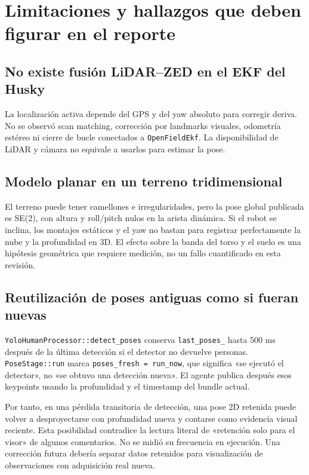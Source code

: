 \documentclass[11pt,a4paper]{article}
\newcommand{\code}[1]{\nolinkurl{#1}}
\begin{document}
\section{Limitaciones y hallazgos que deben figurar en el reporte}
\label{sec:limits}

\subsection{No existe fusión LiDAR--ZED en el EKF del Husky}
La localización activa depende del GPS y del yaw absoluto para corregir deriva.
No se observó scan matching, corrección por landmarks visuales, odometría estéreo
ni cierre de bucle conectados a \code{OpenFieldEkf}. La disponibilidad de LiDAR y
cámara no equivale a usarlos para estimar la pose.~\cite{ekf,openworker}

\subsection{Modelo planar en un terreno tridimensional}
El terreno puede tener camellones e irregularidades, pero la pose global publicada
es SE(2), con altura y roll/pitch nulos en la arista dinámica. Si el robot se inclina,
los montajes estáticos y el yaw no bastan para registrar perfectamente la nube y
la profundidad en 3D. El efecto sobre la banda del torso y el suelo es una hipótesis
geométrica que requiere medición, no un fallo cuantificado en esta revisión.
\cite{worlds,opengraph}

\subsection{Reutilización de poses antiguas como si fueran nuevas}
\code{YoloHumanProcessor::detect_poses} conserva \code{last_poses_} hasta 500 ms
después de la última detección si el detector no devuelve personas.
\code{PoseStage::run} marca \code{poses_fresh = run_now}, que significa «se ejecutó
el detector», no «se obtuvo una detección nueva». El agente publica después esos
keypoints usando la profundidad y el timestamp del bundle actual.~\cite{yolohuman,posestage,retinaworker}

Por tanto, en una pérdida transitoria de detección, una pose 2D retenida puede
volver a desproyectarse con profundidad nueva y contarse como evidencia visual
reciente. Esta posibilidad contradice la lectura literal de «retención solo para
el visor» de algunos comentarios. No se midió su frecuencia en ejecución. Una
corrección futura debería separar datos retenidos para visualización de observaciones
con adquisición real nueva.~\cite{graphpublisher,humanworker}
\end{document}
